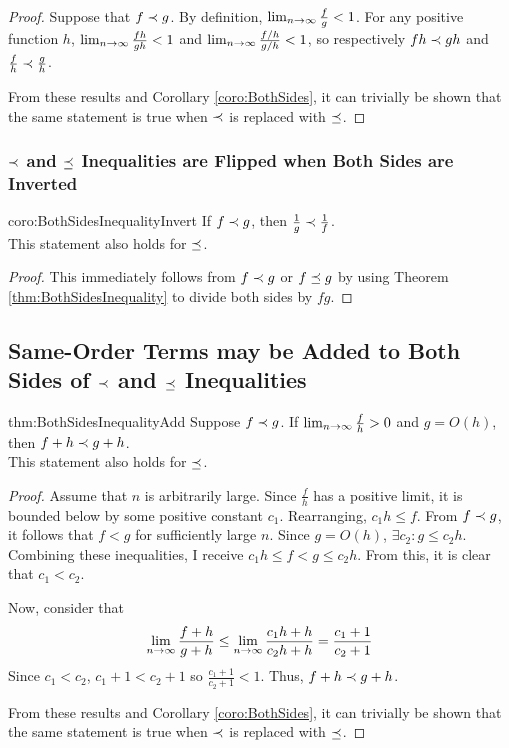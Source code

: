 \begin{proof}
	Suppose that $f \prec g$. By definition, $\lim_{n \to \infty} \frac{f}{g} < 1$. For any positive function $h$, $\lim_{n \to \infty} \frac{fh}{gh} < 1$ and $\lim_{n \to \infty} \frac{f / h}{g / h} < 1$, so respectively $fh \prec gh$ and $\frac{f}{h} \prec \frac{g}{h}$.
	
	From these results and Corollary \ref{coro:BothSides}, it can trivially be shown that the same statement is true when $\prec$ is replaced with $\preceq$.
\end{proof}

\subsubsection{$\prec$ and $\preceq$ Inequalities are Flipped when Both Sides are Inverted}

\begin{repcorollary}{coro:BothSidesInequalityInvert}
	If $f \prec g$, then $\frac{1}{g} \prec \frac{1}{f}$.\\
	This statement also holds for $\preceq$.
\end{repcorollary}

\begin{proof}
	This immediately follows from $f \prec g$ or $f \preceq g$ by using Theorem \ref{thm:BothSidesInequality} to divide both sides by $fg$.
\end{proof}

\subsection{Same-Order Terms may be Added to Both Sides of $\prec$ and $\preceq$ Inequalities}

\begin{reptheorem}{thm:BothSidesInequalityAdd}
	Suppose $f \prec g$. If $\lim_{n \to \infty} \frac{f}{h} > 0$ and $g = O(h)$, then $f + h \prec g + h$.\\
	This statement also holds for $\preceq$.
\end{reptheorem}

\begin{proof}
	Assume that $n$ is arbitrarily large. Since $\frac{f}{h}$ has a positive limit, it is bounded below by some positive constant $c_1$. Rearranging, $c_1 h \leq f$. From $f \prec g$, it follows that $f < g$ for sufficiently large $n$. Since $g = O(h)$, $\exists c_2 : g \leq c_2 h$. Combining these inequalities, I receive $c_1 h \leq f < g \leq c_2 h$. From this, it is clear that $c_1 < c_2$.
	
	Now, consider that
	\begin{align*}
	\lim_{n \to \infty} \frac{f + h}{g + h} \leq \lim_{n \to \infty} \frac{c_1 h + h}{c_2 h + h} = \frac{c_1 + 1}{c_2 + 1}
	\end{align*}
	Since $c_1 < c_2$, $c_1 + 1 < c_2 + 1$ so $\frac{c_1 + 1}{c_2 + 1} < 1$. Thus, $f + h \prec g + h$.
	
	From these results and Corollary \ref{coro:BothSides}, it can trivially be shown that the same statement is true when $\prec$ is replaced with $\preceq$.
\end{proof}